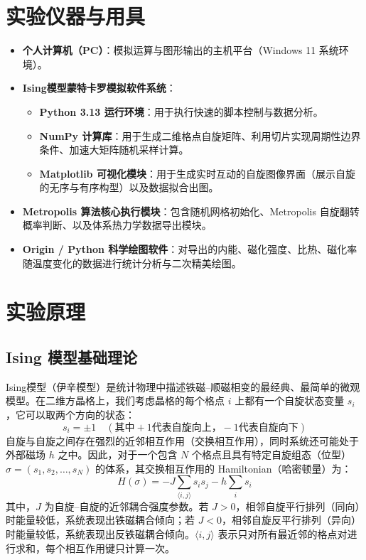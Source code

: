 \documentclass[11pt]{article}
\begin{document}
\section{实验仪器与用具}
\begin{itemize}
    \item \textbf{个人计算机（PC）}：模拟运算与图形输出的主机平台（Windows 11 系统环境）。
    \item \textbf{Ising模型蒙特卡罗模拟软件系统}：
        \begin{itemize}
            \item \textbf{Python 3.13 运行环境}：用于执行快速的脚本控制与数据分析。
            \item \textbf{NumPy 计算库}：用于生成二维格点自旋矩阵、利用切片实现周期性边界条件、加速大矩阵随机采样计算。
            \item \textbf{Matplotlib 可视化模块}：用于生成实时互动的自旋图像界面（展示自旋的无序与有序构型）以及数据拟合出图。
        \end{itemize}
    \item \textbf{Metropolis 算法核心执行模块}：包含随机网格初始化、Metropolis 自旋翻转概率判断、以及体系热力学数据导出模块。
    \item \textbf{Origin / Python 科学绘图软件}：对导出的内能、磁化强度、比热、磁化率随温度变化的数据进行统计分析与二次精美绘图。
\end{itemize}

\section{实验原理}

\subsection{Ising 模型基础理论}
Ising模型（伊辛模型）是统计物理中描述铁磁--顺磁相变的最经典、最简单的微观模型。在二维方晶格上，我们考虑晶格的每个格点 $i$ 上都有一个自旋状态变量 $s_i$，它可以取两个方向的状态：
\begin{equation}
    s_i = \pm 1 \quad (\text{其中} +1 \text{代表自旋向上}，-1 \text{代表自旋向下})
\end{equation}
自旋与自旋之间存在强烈的近邻相互作用（交换相互作用），同时系统还可能处于外部磁场 $h$ 之中。因此，对于一个包含 $N$ 个格点且具有特定自旋组态（位型） $\sigma = (s_1, s_2, \dots, s_N)$ 的体系，其交换相互作用的 Hamiltonian（哈密顿量）为：
\begin{equation}
    H(\sigma) = -J \sum_{\langle i, j \rangle} s_i s_j - h \sum_i s_i
\end{equation}
其中，$J$ 为自旋--自旋的近邻耦合强度参数。若 $J > 0$，相邻自旋平行排列（同向）时能量较低，系统表现出铁磁耦合倾向；若 $J < 0$，相邻自旋反平行排列（异向）时能量较低，系统表现出反铁磁耦合倾向。$\langle i, j \rangle$ 表示只对所有最近邻的格点对进行求和，每个相互作用键只计算一次。
\end{document}
